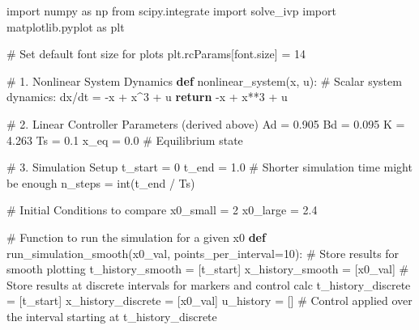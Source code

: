 \documentclass[
  letterpaper,
  DIV=11,
  numbers=noendperiod,
  oneside]{scrartcl}
\newenvironment{Shaded}{\begin{snugshade}}{\end{snugshade}}
\newcommand{\BuiltInTok}[1]{\textcolor[rgb]{0.00,0.23,0.31}{#1}}
\newcommand{\CommentTok}[1]{\textcolor[rgb]{0.37,0.37,0.37}{#1}}
\newcommand{\ControlFlowTok}[1]{\textcolor[rgb]{0.00,0.23,0.31}{\textbf{#1}}}
\newcommand{\DecValTok}[1]{\textcolor[rgb]{0.68,0.00,0.00}{#1}}
\newcommand{\FloatTok}[1]{\textcolor[rgb]{0.68,0.00,0.00}{#1}}
\newcommand{\ImportTok}[1]{\textcolor[rgb]{0.00,0.46,0.62}{#1}}
\newcommand{\KeywordTok}[1]{\textcolor[rgb]{0.00,0.23,0.31}{\textbf{#1}}}
\newcommand{\NormalTok}[1]{\textcolor[rgb]{0.00,0.23,0.31}{#1}}
\newcommand{\OperatorTok}[1]{\textcolor[rgb]{0.37,0.37,0.37}{#1}}
\newcommand{\StringTok}[1]{\textcolor[rgb]{0.13,0.47,0.30}{#1}}
\begin{document}
\begin{Shaded}
\begin{Highlighting}[numbers=left,,]
\ImportTok{import}\NormalTok{ numpy }\ImportTok{as}\NormalTok{ np}
\ImportTok{from}\NormalTok{ scipy.integrate }\ImportTok{import}\NormalTok{ solve\_ivp}
\ImportTok{import}\NormalTok{ matplotlib.pyplot }\ImportTok{as}\NormalTok{ plt}

\CommentTok{\# Set default font size for plots}
\NormalTok{plt.rcParams[}\StringTok{\textquotesingle{}font.size\textquotesingle{}}\NormalTok{] }\OperatorTok{=} \DecValTok{14} 

\CommentTok{\# 1. Nonlinear System Dynamics}
\KeywordTok{def}\NormalTok{ nonlinear\_system(x, u):}
    \CommentTok{\# Scalar system dynamics: dx/dt = {-}x + x\^{}3 + u}
    \ControlFlowTok{return} \OperatorTok{{-}}\NormalTok{x }\OperatorTok{+}\NormalTok{ x}\OperatorTok{**}\DecValTok{3} \OperatorTok{+}\NormalTok{ u}

\CommentTok{\# 2. Linear Controller Parameters (derived above)}
\NormalTok{Ad }\OperatorTok{=} \FloatTok{0.905}
\NormalTok{Bd }\OperatorTok{=} \FloatTok{0.095}
\NormalTok{K }\OperatorTok{=} \FloatTok{4.263}
\NormalTok{Ts }\OperatorTok{=} \FloatTok{0.1}
\NormalTok{x\_eq }\OperatorTok{=} \FloatTok{0.0} \CommentTok{\# Equilibrium state}

\CommentTok{\# 3. Simulation Setup}
\NormalTok{t\_start }\OperatorTok{=} \DecValTok{0}
\NormalTok{t\_end }\OperatorTok{=} \FloatTok{1.0} \CommentTok{\# Shorter simulation time might be enough}
\NormalTok{n\_steps }\OperatorTok{=} \BuiltInTok{int}\NormalTok{(t\_end }\OperatorTok{/}\NormalTok{ Ts)}

\CommentTok{\# Initial Conditions to compare}
\NormalTok{x0\_small }\OperatorTok{=} \DecValTok{2}
\NormalTok{x0\_large }\OperatorTok{=} \FloatTok{2.4}

\CommentTok{\# Function to run the simulation for a given x0}
\KeywordTok{def}\NormalTok{ run\_simulation\_smooth(x0\_val, points\_per\_interval}\OperatorTok{=}\DecValTok{10}\NormalTok{):}
    \CommentTok{\# Store results for smooth plotting}
\NormalTok{    t\_history\_smooth }\OperatorTok{=}\NormalTok{ [t\_start]}
\NormalTok{    x\_history\_smooth }\OperatorTok{=}\NormalTok{ [x0\_val]}
    \CommentTok{\# Store results at discrete intervals for markers and control calc}
\NormalTok{    t\_history\_discrete }\OperatorTok{=}\NormalTok{ [t\_start]}
\NormalTok{    x\_history\_discrete }\OperatorTok{=}\NormalTok{ [x0\_val]}
\NormalTok{    u\_history }\OperatorTok{=}\NormalTok{ [] }\CommentTok{\# Control applied over the interval starting at t\_history\_discrete}


\end{Highlighting}
\end{Shaded}
\end{document}
